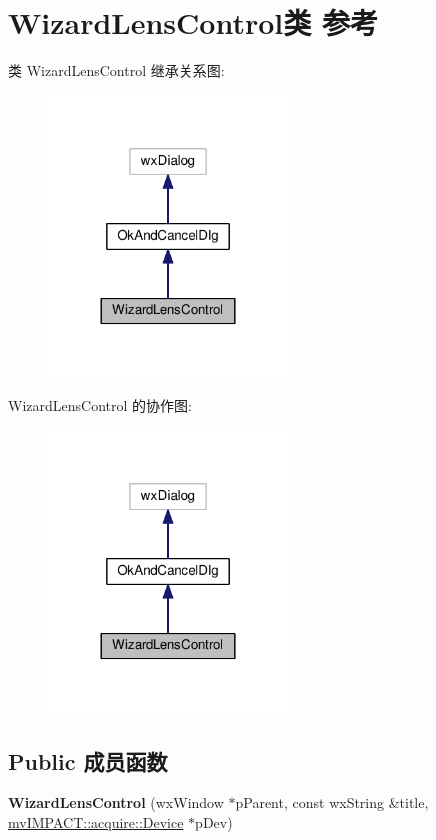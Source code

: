 \hypertarget{class_wizard_lens_control}{\section{Wizard\+Lens\+Control类 参考}
\label{class_wizard_lens_control}
}


类 Wizard\+Lens\+Control 继承关系图\+:
\nopagebreak
\begin{figure}[H]
\begin{center}
\leavevmode
\includegraphics[width=180pt]{class_wizard_lens_control__inherit__graph}
\end{center}
\end{figure}


Wizard\+Lens\+Control 的协作图\+:
\nopagebreak
\begin{figure}[H]
\begin{center}
\leavevmode
\includegraphics[width=180pt]{class_wizard_lens_control__coll__graph}
\end{center}
\end{figure}
\subsection*{Public 成员函数}
\begin{DoxyCompactItemize}
\item 
\hypertarget{class_wizard_lens_control_a0e15a63afb6e455de8dcf4759bf37699}{{\bfseries Wizard\+Lens\+Control} (wx\+Window $\ast$p\+Parent, const wx\+String \&title, \hyperlink{classmv_i_m_p_a_c_t_1_1acquire_1_1_device}{mv\+I\+M\+P\+A\+C\+T\+::acquire\+::\+Device} $\ast$p\+Dev)}\label{class_wizard_lens_control_a0e15a63afb6e455de8dcf4759bf37699}

\end{DoxyCompactItemize}
